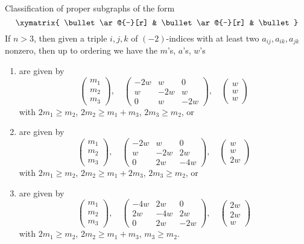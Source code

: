 \begin{lemma}
\label{lemma-three-by-three}
Classification of proper subgraphs of the form
$$
\xymatrix{
\bullet \ar@{-}[r] &
\bullet \ar@{-}[r] &
\bullet
}
$$
If $n > 3$, then given a triple $i, j, k$ of $(-2)$-indices
with at least two $a_{ij}, a_{ik}, a_{jk}$ nonzero, then up
to ordering we have the $m$'s, $a$'s, $w$'s
\begin{enumerate}
\item
\label{item-A3}
are given by
$$
\left(
\begin{matrix}
m_1 \\
m_2 \\
m_3
\end{matrix}
\right),
\quad
\left(
\begin{matrix}
-2w & w & 0 \\
w & -2w & w \\
0 & w & -2w
\end{matrix}
\right),
\quad
\left(
\begin{matrix}
w \\
w \\
w
\end{matrix}
\right)
$$
with $2m_1 \geq m_2$, $2m_2 \geq m_1 + m_3$, $2m_3 \geq m_2$, or
\item
\label{item-C3}
are given by
$$
\left(
\begin{matrix}
m_1 \\
m_2 \\
m_3
\end{matrix}
\right),
\quad
\left(
\begin{matrix}
-2w & w & 0 \\
w & -2w & 2w \\
0 & 2w & -4w
\end{matrix}
\right),
\quad
\left(
\begin{matrix}
w \\
w \\
2w
\end{matrix}
\right)
$$
with $2m_1 \geq m_2$, $2m_2 \geq m_1 + 2m_3$, $2m_3 \geq m_2$, or
\item
\label{item-B3}
are given by
$$
\left(
\begin{matrix}
m_1 \\
m_2 \\
m_3
\end{matrix}
\right),
\quad
\left(
\begin{matrix}
-4w & 2w & 0 \\
2w & -4w & 2w \\
0 & 2w & -2w
\end{matrix}
\right),
\quad
\left(
\begin{matrix}
2w \\
2w \\
w
\end{matrix}
\right)
$$
with $2m_1 \geq m_2$, $2m_2 \geq m_1 + m_3$, $m_3 \geq m_2$.
\end{enumerate}
\end{lemma}


